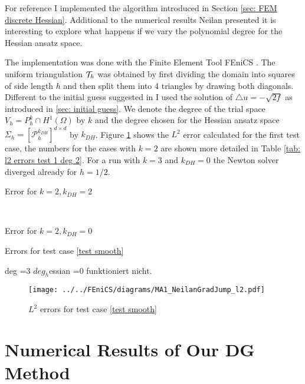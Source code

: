 For reference I implemented the algorithm introduced in Section \ref{sec: FEM discrete Hessian}.
Additional to the numerical results Neilan presented it is interesting to explore what happens if we vary the polynomial degree for the Hessian ansatz space. 

The implementation was done with the Finite Element Tool FEniCS \cite{FEniCS}. The uniform triangulation $\mathcal{T}_h$ was obtained by first dividing the domain into squares of side length $h$ and then split them into 4 triangles by drawing both diagonals. \\
Different to the initial guess suggested in \cite{Neilan2014} I used the solution of $\triangle u = -\sqrt{2f}$ as introduced in \ref{sec: initial guess}. 
We denote the degree of the trial space $V_h=P_h^k \cap H^1(\Omega)$ by $k$ and the degree chosen for the Hessian ansatz space $\Sigma_h = [\mathcal{P}_h^{k_{DH}}]^{d \times d}$ by $k_{DH}$.
Figure \ref{fig: l2 errors test 1} shows the $L^2$ error calculated for the first test case, the numbers for the cases with $k=2$ are shown more detailed in Table \ref{tab: l2 errors test 1 deg 2}. For a run with $k=3$ and $k_{DH}=0$  the Newton solver diverged already for $h=1/2$. 



\begin{table}[h]
	\begin{subtable}[b]{0.45\textwidth}
		\centering
		\pgfplotstabletypeset[columns={iterations, l2error, h1error,N}]\MAOneJumpdegTwoTwo
    	\caption{Error for $k=2, k_{DH}=2$}
   \end{subtable}
   ~
	\begin{subtable}[b]{0.45\textwidth}
		\centering
		\pgfplotstabletypeset[columns={iterations, l2error, h1error,N}]\MAOneJumpdegTwoZero
 	\caption{Error for $k=2, k_{DH}=0$}
	\end{subtable}
	\caption{Errors for test case \ref{test smooth}}
	\label{tab: l2 errors test 1 deg 2}
\end{table}

deg =3 $deg_h$essian =0 funktioniert nicht.

\begin{figure}[h]
	\texttt{[image: ../../FEniCS/diagrams/MA1\_NeilanGradJump\_l2.pdf]}
	\caption{$L^2$ errors for test case \ref{test smooth}}
	\label{fig: l2 errors test 1}
\end{figure}

\section{Numerical Results of Our DG Method}



